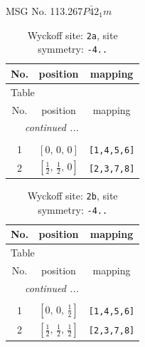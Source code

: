 \documentclass[fleqn,8pt]{jsarticle}
\begin{document}
\setcounter{MaxMatrixCols}{32}

\renewcommand{\tablename}{Table~}
\renewcommand{\figurename}{Figure~}
\begin{center}
\LARGE
MSG No. 113.267\quad$P\bar{4}2_{1}m$
\end{center}
\renewcommand{\arraystretch}{1.2}
\begin{longtable}{ccc}
\caption{Wyckoff site: {\tt 2a}, site symmetry: {\tt -4..}}
 \\
 \hline \hline
No. & position & mapping \\ \hline \endfirsthead

\multicolumn{2}{l}{\tablename\ \thetable{}} \\
 \hline \hline
No. & position & mapping \\ \hline \endhead

 \hline \hline
\multicolumn{2}{r}{\footnotesize\it continued ...} \\ \endfoot

 \hline \hline
\multicolumn{2}{r}{} \\ \endlastfoot

1 & $\left[ 0,\, 0,\, 0 \right]$ & {\tt [1,4,5,6]} \\ \hline
2 & $\left[ \frac{1}{2},\, \frac{1}{2},\, 0 \right]$ & {\tt [2,3,7,8]} \\
\end{longtable}
\renewcommand{\arraystretch}{1.2}
\begin{longtable}{ccc}
\caption{Wyckoff site: {\tt 2b}, site symmetry: {\tt -4..}}
 \\
 \hline \hline
No. & position & mapping \\ \hline \endfirsthead

\multicolumn{2}{l}{\tablename\ \thetable{}} \\
 \hline \hline
No. & position & mapping \\ \hline \endhead

 \hline \hline
\multicolumn{2}{r}{\footnotesize\it continued ...} \\ \endfoot

 \hline \hline
\multicolumn{2}{r}{} \\ \endlastfoot

1 & $\left[ 0,\, 0,\, \frac{1}{2} \right]$ & {\tt [1,4,5,6]} \\ \hline
2 & $\left[ \frac{1}{2},\, \frac{1}{2},\, \frac{1}{2} \right]$ & {\tt [2,3,7,8]} \\
\end{longtable}
\end{document}
